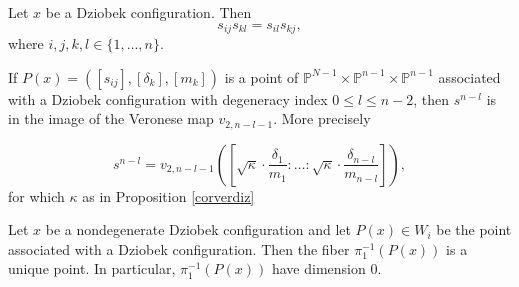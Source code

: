 \documentclass[10pt,a4paper]{amsart}
\begin{document}
\begin{corollary}\label{corverdiz}
Let $x$ be a Dziobek configuration. Then
\begin{equation}\label{verdiz}
    s_{ij} s_{kl} = s_{il}s_{kj},
\end{equation}
where $i, j, k, l \in \{1, \dots, n\}$.
\end{corollary}

\begin{lemma} \label{lemgeoverdiz}
If $P(x)=([s_{ij}], [\delta_k], [m_k])$ is a point of $\mathbb{P}^{N-1}\times \mathbb{P}^{n-1}\times \mathbb{P}^{n-1}$  associated with a Dziobek configuration with degeneracy index $0 \leq l \leq n-2$, then $s^{n-l}$ is in the image of the Veronese map $v_{2,n-l-1}$. More precisely 

$$s^{n-l}=v_{2,n-l-1}\left( \left[ \sqrt{\kappa} \cdot \frac{\delta_1}{m_1}: \dots : \sqrt{\kappa} \cdot \frac{\delta_{n-l}}{m_{n-l}} \right] \right),$$
for which $\kappa$ as in Proposition \ref{corverdiz}
\end{lemma}

\begin{proposition}\label{nondencase}
Let $x$ be a nondegenerate  Dziobek configuration and let $P(x) \in W_i$ be the point associated with a Dziobek configuration. Then the fiber $\pi_1^{-1}(P(x))$ is a unique point. In particular, $\pi_1^{-1}(P(x))$ have dimension $0$.
\end{proposition}
\end{document}

